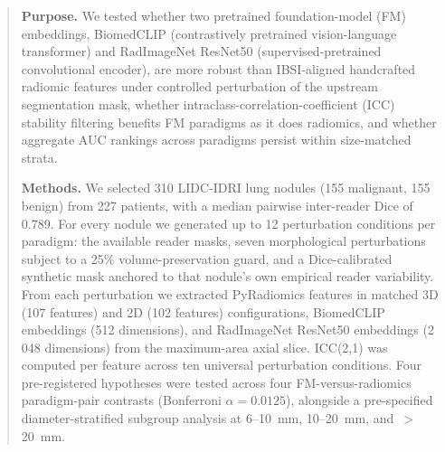 
\begin{abstract}
\noindent\textbf{Purpose.} We tested whether two pretrained foundation-model (FM) embeddings, BiomedCLIP (contrastively pretrained vision-language transformer) and RadImageNet ResNet50 (supervised-pretrained convolutional encoder), are more robust than IBSI-aligned handcrafted radiomic features under controlled perturbation of the upstream segmentation mask, whether intraclass-correlation-coefficient (ICC) stability filtering benefits FM paradigms as it does radiomics, and whether aggregate AUC rankings across paradigms persist within size-matched strata.

\noindent\textbf{Methods.} We selected 310 LIDC-IDRI lung nodules (155 malignant, 155 benign) from 227 patients, with a median pairwise inter-reader Dice of 0.789. For every nodule we generated up to 12 perturbation conditions per paradigm: the available reader masks, seven morphological perturbations subject to a 25\% volume-preservation guard, and a Dice-calibrated synthetic mask anchored to that nodule's own empirical reader variability. From each perturbation we extracted PyRadiomics features in matched 3D (107 features) and 2D (102 features) configurations, BiomedCLIP embeddings (512 dimensions), and RadImageNet ResNet50 embeddings (2\,048 dimensions) from the maximum-area axial slice. ICC(2,1) was computed per feature across ten universal perturbation conditions. Four pre-registered hypotheses were tested across four FM-versus-radiomics paradigm-pair contrasts (Bonferroni $\alpha = 0.0125$), alongside a pre-specified diameter-stratified subgroup analysis at 6--10~mm, 10--20~mm, and~$>$20~mm.


\end{abstract}
